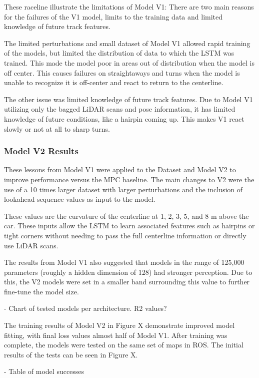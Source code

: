 \documentclass[conference]{IEEEtran}
\begin{document}
These raceline illustrate the limitations of Model V1: There are two main reasons for the failures of the V1 model, limits to the training data and limited knowledge of future track features. 

The limited perturbations and small dataset of Model V1 allowed rapid training of the models, but limited the distribution of data to which the LSTM was trained. This made the model poor in areas out of distribution when the model is off center. This causes failures on straightaways and turns when the model is unable to recognize it is off-center and react to return to the centerline. 

The other issue was limited knowledge of future track features. Due to Model V1 utilizing only the bagged LiDAR scans and pose information, it has limited knowledge of future conditions, like a hairpin coming up. This makes V1 react slowly or not at all to sharp turns.

\subsubsection{Model V2 Results}

These lessons from Model V1 were applied to the Dataset and Model V2 to improve performance versus the MPC baseline. The main changes to V2 were the use of a 10 times larger dataset with larger perturbations and the inclusion of lookahead sequence values as input to the model.

These values are the curvature of the centerline at 1, 2, 3, 5, and 8 m above the car. These inputs allow the LSTM to learn associated features such as hairpins or tight corners without needing to pass the full centerline information or directly use LiDAR scans. 

The results from Model V1 also suggested that models in the range of 125,000 parameters (roughly a hidden dimension of 128) had stronger perception. Due to this, the V2 models were set in a smaller band surrounding this value to further fine-tune the model size. 

- Chart of tested models per architecture. R2 values?

The training results of Model V2 in Figure X demonstrate improved model fitting, with final loss values almost half of Model V1. After training was complete, the models were tested on the same set of maps in ROS. The initial results of the tests can be seen in Figure X.

- Table of model successes
\end{document}
